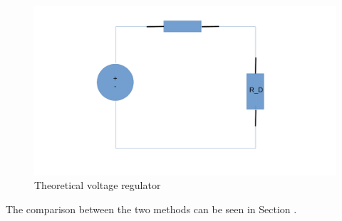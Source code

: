 \begin{figure}[H] \centering
\includegraphics[width=0.8\linewidth]{octave2.pdf}
\caption{Theoretical voltage regulator}
\label{fig:oc2}
\end{figure} 
The comparison between the two methods can be seen in Section .